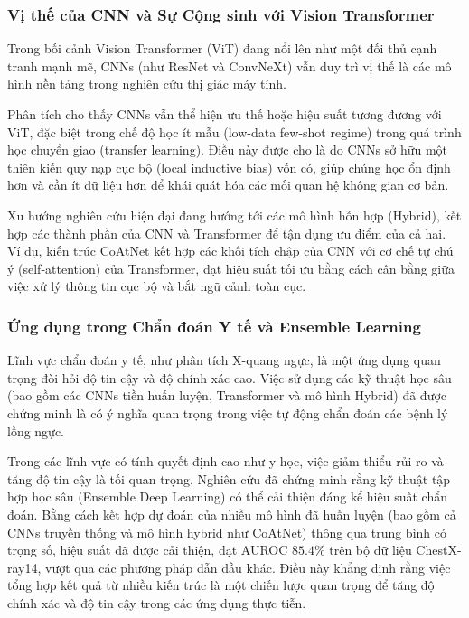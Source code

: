 \subsubsection{Vị thế của CNN và Sự Cộng sinh với Vision Transformer}

Trong bối cảnh Vision Transformer (ViT) đang nổi lên như một đối thủ cạnh tranh mạnh mẽ, 
CNNs (như ResNet và ConvNeXt) vẫn duy trì vị thế là các mô hình nền tảng trong nghiên cứu 
thị giác máy tính. \cite{Lin2025}

Phân tích cho thấy CNNs vẫn thể hiện ưu thế hoặc hiệu suất tương đương với ViT, đặc biệt trong 
chế độ học ít mẫu (low-data few-shot regime) trong quá trình học chuyển giao (transfer learning). 
Điều này được cho là do CNNs sở hữu một thiên kiến quy nạp cục bộ (local inductive bias) vốn có, 
giúp chúng học ổn định hơn và cần ít dữ liệu hơn để khái quát hóa các mối quan hệ không gian cơ 
bản.

Xu hướng nghiên cứu hiện đại đang hướng tới các mô hình hỗn hợp (Hybrid), kết hợp các thành 
phần của CNN và Transformer để tận dụng ưu điểm của cả hai. Ví dụ, kiến trúc CoAtNet kết hợp 
các khối tích chập của CNN với cơ chế tự chú ý (self-attention) của Transformer, đạt hiệu suất
 tối ưu bằng cách cân bằng giữa việc xử lý thông tin cục bộ và bắt ngữ cảnh toàn cục.

\subsubsection{Ứng dụng trong Chẩn đoán Y tế và Ensemble Learning}

Lĩnh vực chẩn đoán y tế, như phân tích X-quang ngực, là một ứng dụng quan trọng đòi hỏi độ 
tin cậy và độ chính xác cao. Việc sử dụng các kỹ thuật học sâu (bao gồm các CNNs tiền huấn 
luyện, Transformer và mô hình Hybrid) đã được chứng minh là có ý nghĩa quan trọng trong việc 
tự động chẩn đoán các bệnh lý lồng ngực.

Trong các lĩnh vực có tính quyết định cao như y học, việc giảm thiểu rủi ro và tăng độ tin 
cậy là tối quan trọng. Nghiên cứu đã chứng minh rằng kỹ thuật tập hợp học sâu (Ensemble Deep 
Learning) có thể cải thiện đáng kể hiệu suất chẩn đoán.\cite{Lin2025} Bằng cách kết hợp 
dự đoán của nhiều mô hình đã huấn luyện (bao gồm cả CNNs truyền thống và mô hình hybrid như 
CoAtNet) thông qua trung bình có trọng số, hiệu suất đã được cải thiện, đạt AUROC $85.4\%$ 
trên bộ dữ liệu ChestX-ray14, vượt qua các phương pháp dẫn đầu khác.\cite{Lin2025} Điều 
này khẳng định rằng việc tổng hợp kết quả từ nhiều kiến trúc là một chiến lược quan trọng để 
tăng độ chính xác và độ tin cậy trong các ứng dụng thực tiễn.



